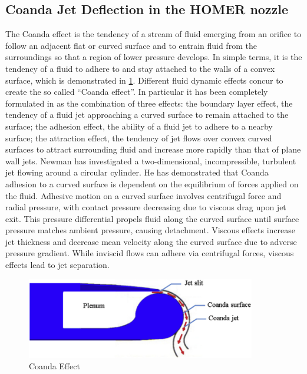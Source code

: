 \subsection{Coanda Jet Deflection in the HOMER nozzle}
The Coanda effect is the tendency of a stream of fluid emerging from an orifice to follow an adjacent flat or curved surface and to entrain fluid from the surroundings so that a region of lower pressure develops. In simple terms, it is the tendency of a fluid to adhere to and stay attached to the walls of a convex surface, which is demonstrated in \ref{fig:Coanda}. Different fluid dynamic effects concur to create the so called “Coanda effect”. In particular it has been completely formulated in as the combination of three effects: the boundary layer effect, the tendency of a fluid jet approaching a curved surface to remain attached to the surface; the adhesion effect, the ability of a fluid jet to adhere to a nearby surface; the attraction effect, the tendency of jet flows over convex curved surfaces to attract surrounding fluid and increase more rapidly than that of plane wall jets. Newman \cite{newman} has investigated a two-dimensional, incompressible, turbulent jet flowing around a circular cylinder. He has demonstrated that Coanda adhesion to a curved surface is dependent on the equilibrium of forces applied on the fluid. Adhesive motion on a curved surface involves centrifugal force and radial pressure, with contact pressure decreasing due to viscous drag upon jet exit. This pressure differential propels fluid along the curved surface until surface pressure matches ambient pressure, causing detachment. Viscous effects increase jet thickness and decrease mean velocity along the curved surface due to adverse pressure gradient. While inviscid flows can adhere via centrifugal forces, viscous effects lead to jet separation.
\begin{figure}[ht]
    \centering
    \includegraphics[width=10cm]{images/Theory-CFD/Coanda-effect.png}
    \caption{Coanda Effect}
    \label{fig:Coanda}
  \end{figure}

